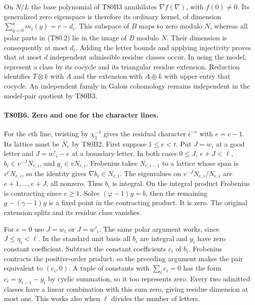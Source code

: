On $N/L$ the base polynomial of T80B3 annihilates
$\nabla f(\nabla)$, with $f(0)\ne0$. Its generalized zero eigenspace
is therefore its ordinary kernel, of dimension
$\sum_{y=0}^a m_i(y)=r-d_i$. This subspace of $B$ maps to zero modulo
$N$, whereas all polar parts in (T80.2) lie in the image of $B$ modulo
$N$. Their dimension is consequently at most $d_i$. Adding the letter
bounds and applying injectivity proves that at most $d$ independent
admissible residue classes occur. In using the model, represent a class
by its cocycle and its triangular residue extension. Reduction identifies
$T\otimes k$ with $A$ and the extension with $A\oplus k$ with upper
entry that cocycle. An independent family in Galois cohomology remains
independent in the model-pair quotient by T80B3.

\paragraph{T80B6. Zero and one for the character lines.}
For the $c$th line, twisting by $\chi_1^{-1}$ gives the residual
character $\bar\epsilon^{-e}$ with $e=c-1$. Its lattice must be
$N_e$ by T80B2. First suppose $1\le e<t$. Put $J=w_i$ at a good
letter and $J=w'_i-e$ at a boundary letter. In both cases
$0\le J$, $e+J<\ell$, $b_i\in v^{-J}N_{e,i}$, and
$g_i\in vN_{e,i}$. Frobenius takes $N_{e,i-1}$ to a lattice
whose span is $v^eN_{e,i}$, so the identity gives $\nabla b_i\in N_{e,i}$.
The eigenvalues on $v^{-J}N_{e,i}/N_{e,i}$ are
$e+1,\ldots,e+J$, all nonzero. Thus $b_i$ is integral. On the
integral product Frobenius is contracting since $e\ge1$. Solve
$(\varphi-1)y=b$, then the remaining $g-(\gamma-1)y$ is a fixed
point in the contracting product. It is zero. The original extension
splits and its residue class vanishes.

For $e=0$ use $J=w_i$ or $J=w'_i$. The same polar argument works,
since $J\le\eta_i<\ell$. In the standard unit basis all $b_i$ are
integral and $g_i$ have zero constant coefficient. Subtract the constant
coefficients $c_i$ of $b_i$. Frobenius contracts the positive-order
product, so the preceding argument makes the pair equivalent to
$(c_i,0)$. A tuple of constants with $\sum_i c_i=0$ has the form
$c_i=y_{i-1}-y_i$ by cyclic summation, so it too represents zero.
Every two admitted classes have a linear combination with this sum
zero, giving residue dimension at most one. This works also when
$\ell$ divides the number of letters.

